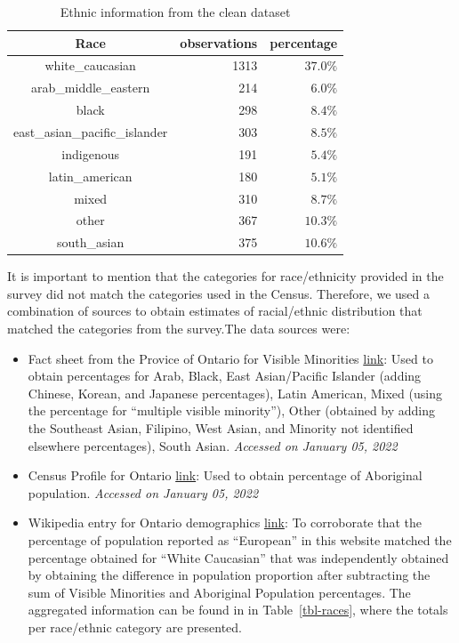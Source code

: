 \documentclass[
  letterpaper,
  DIV=11,
  numbers=noendperiod]{scrartcl}
\begin{document}
\begin{longtable}{crr}
\caption{Ethnic information from the clean dataset}\tabularnewline

\toprule
Race & observations & percentage \\ 
\midrule
white\_caucasian & 1313 & $37.0\%$ \\ 
arab\_middle\_eastern & 214 & $6.0\%$ \\ 
black & 298 & $8.4\%$ \\ 
east\_asian\_pacific\_islander & 303 & $8.5\%$ \\ 
indigenous & 191 & $5.4\%$ \\ 
latin\_american & 180 & $5.1\%$ \\ 
mixed & 310 & $8.7\%$ \\ 
other & 367 & $10.3\%$ \\ 
south\_asian & 375 & $10.6\%$ \\ 
\bottomrule
\end{longtable}

It is important to mention that the categories for race/ethnicity
provided in the survey did not match the categories used in the Census.
Therefore, we used a combination of sources to obtain estimates of
racial/ethnic distribution that matched the categories from the
survey.The data sources were:

\begin{itemize}
\item
  Fact sheet from the Provice of Ontario for Visible Minorities
  \href{https://www.ontario.ca/document/2016-census-highlights/fact-sheet-9-ethnic-origin-and-visible-minorities}{link}:
  Used to obtain percentages for Arab, Black, East Asian/Pacific
  Islander (adding Chinese, Korean, and Japanese percentages), Latin
  American, Mixed (using the percentage for ``multiple visible
  minority''), Other (obtained by adding the Southeast Asian, Filipino,
  West Asian, and Minority not identified elsewhere percentages), South
  Asian. \emph{Accessed on January 05, 2022}
\item
  Census Profile for Ontario
  \href{https://www12.statcan.gc.ca/census-recensement/2016/dp-pd/prof/details/page.cfm?Lang=E\&Geo1=PR\&Code1=35\&Geo2=PR\&Code2=01\&SearchText=Ontario\&SearchType=Begins\&SearchPR=01\&B1=Aboriginal\%20peoples\&TABID=1\&type=1}{link}:
  Used to obtain percentage of Aboriginal population. \emph{Accessed on
  January 05, 2022}
\item
  Wikipedia entry for Ontario demographics
  \href{https://en.wikipedia.org/wiki/Demographics_of_Ontario}{link}: To
  corroborate that the percentage of population reported as ``European''
  in this website matched the percentage obtained for ``White
  Caucasian'' that was independently obtained by obtaining the
  difference in population proportion after subtracting the sum of
  Visible Minorities and Aboriginal Population percentages. The
  aggregated information can be found in in Table~\ref{tbl-races}, where
  the totals per race/ethnic category are presented.
\end{itemize}
\end{document}
